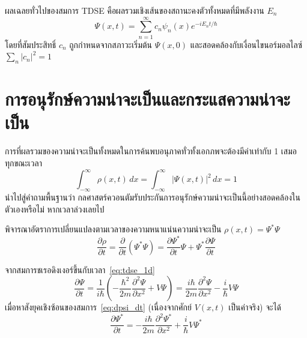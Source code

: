 ผลเฉลยทั่วไปของสมการ TDSE คือผลรวมเชิงเส้นของสถานะคงตัวทั้งหมดที่มีพลังงาน $E_n$
\begin{equation}
\Psi(x, t) = \sum_{n=1}^{\infty} c_n \psi_n(x) e^{-iE_n t/\hbar}
\label{eq:general_solution_superposition}
\end{equation}
โดยที่สัมประสิทธิ์ $c_n$ ถูกกำหนดจากสภาวะเริ่มต้น $\Psi(x, 0)$ และสอดคล้องกับเงื่อนไขนอร์มอลไลซ์ $\sum_n |c_n|^2 = 1$

\section{การอนุรักษ์ความน่าจะเป็นและกระแสความน่าจะเป็น}

การที่ผลรวมของความน่าจะเป็นทั้งหมดในการค้นพบอนุภาคทั่วทั้งเอกภพจะต้องมีค่าเท่ากับ 1 เสมอ ทุกขณะเวลา
\begin{equation}
\int_{-\infty}^{\infty} \rho(x, t) \, dx = \int_{-\infty}^{\infty} |\Psi(x, t)|^2 \, dx = 1
\label{eq:total_prob_conserved}
\end{equation}
นำไปสู่คำถามพื้นฐานว่า กลศาสตร์ควอนตัมรับประกันการอนุรักษ์ความน่าจะเป็นนี้อย่างสอดคล้องในตัวเองหรือไม่ หากเวลาล่วงเลยไป

พิจารณาอัตราการเปลี่ยนแปลงตามเวลาของความหนาแน่นความน่าจะเป็น $\rho(x, t) = \Psi^* \Psi$
\begin{equation}
\frac{\partial \rho}{\partial t} = \frac{\partial}{\partial t}(\Psi^* \Psi) = \frac{\partial \Psi^*}{\partial t}\Psi + \Psi^* \frac{\partial \Psi}{\partial t}
\label{eq:drho_dt_product}
\end{equation}

จากสมการชเรอดิงเงอร์ขึ้นกับเวลา~\eqref{eq:tdse_1d}
\begin{equation}
\frac{\partial \Psi}{\partial t} = \frac{1}{i\hbar} \left( -\frac{\hbar^2}{2m} \frac{\partial^2 \Psi}{\partial x^2} + V \Psi \right) = \frac{i\hbar}{2m} \frac{\partial^2 \Psi}{\partial x^2} - \frac{i}{\hbar} V \Psi
\label{eq:dpsi_dt}
\end{equation}
เมื่อหาสังยุคเชิงซ้อนของสมการ~\eqref{eq:dpsi_dt} (เนื่องจากศักย์ $V(x, t)$ เป็นค่าจริง) จะได้
\begin{equation}
\frac{\partial \Psi^*}{\partial t} = -\frac{i\hbar}{2m} \frac{\partial^2 \Psi^*}{\partial x^2} + \frac{i}{\hbar} V \Psi^*
\label{eq:dpsistar_dt}
\end{equation}

